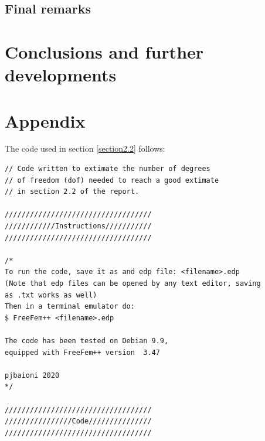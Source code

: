 \documentclass[12pt, a4paper]{report}
\theoremstyle{definition}
\begin{document}
{\section{Final remarks} 



\chapter*{Conclusions and further developments}




\appendix
\chapter*{Appendix}\label{appendix}
The code used in section \ref{section2.2} follows:
\begin{lstlisting}[language=FreeFem++, frame=single, name=extimate_dof, showstringspaces=false]
// Code written to extimate the number of degrees 
// of freedom (dof) needed to reach a good extimate
// in section 2.2 of the report.

///////////////////////////////////
////////////Instructions///////////
///////////////////////////////////

/*	
To run the code, save it as and edp file: <filename>.edp
(Note that edp files can be opened by any text editor, saving
as .txt works as well)
Then in a terminal emulator do:
$ FreeFem++ <filename>.edp

The code has been tested on Debian 9.9,
equipped with FreeFem++ version  3.47 

pjbaioni 2020
*/

///////////////////////////////////
////////////////Code///////////////
///////////////////////////////////


\end{lstlisting}}
\end{document}

